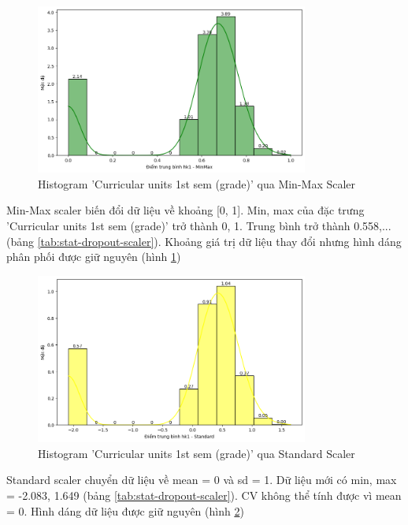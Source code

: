     \begin{figure}[htp]
        \centering
        \includegraphics[width=0.80\textwidth]{images/Table_Dropout_Grade_MinMax.png}
        \caption{Histogram 'Curricular units 1st sem (grade)' qua Min-Max Scaler}
        \label{fig:Table_Dropout_Grade_MinMax}
    \end{figure}

    \FloatBarrier
    
    Min-Max scaler biến đổi dữ liệu về khoảng [0, 1]. Min, max của đặc trưng 'Curricular units 1st sem (grade)' trở thành 0, 1. Trung bình trở thành 0.558,... (bảng \ref{tab:stat-dropout-scaler}). Khoảng giá trị dữ liệu thay đổi nhưng hình dáng phân phối được giữ nguyên (hình \ref{fig:Table_Dropout_Grade_MinMax})

    \begin{figure}[htp]
        \centering
        \includegraphics[width=0.80\textwidth]{images/Table_Dropout_Grade_Standard.png}
        \caption{Histogram 'Curricular units 1st sem (grade)' qua Standard Scaler}
        \label{fig:Table_Dropout_Grade_Standard}
    \end{figure}

    \FloatBarrier

    Standard scaler chuyển dữ liệu về mean = 0 và sd = 1. Dữ liệu mới có min, max = -2.083, 1.649 (bảng \ref{tab:stat-dropout-scaler}). CV không thể tính được vì mean = 0. Hình dáng dữ liệu được giữ nguyên (hình \ref{fig:Table_Dropout_Grade_Standard})


